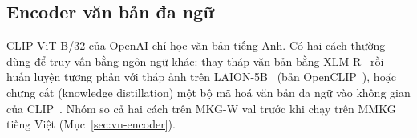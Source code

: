 \subsection{Encoder văn bản đa ngữ}

CLIP ViT-B/32 của OpenAI chỉ học văn bản tiếng Anh. Có hai cách thường dùng để truy vấn bằng ngôn ngữ khác: thay tháp văn
bản bằng XLM-R~\cite{vn-conneau2020xlmr} rồi huấn luyện tương phản với tháp ảnh trên LAION-5B~\cite{vn-schuhmann2022laion5b}
(bản OpenCLIP~\cite{vn-ilharco2021openclip}), hoặc chưng cất (knowledge distillation) một bộ mã hoá văn bản đa ngữ vào
không gian của CLIP~\cite{vn-reimers2020multilingual}. Nhóm so cả hai cách trên MKG-W val trước khi chạy trên MMKG tiếng
Việt (Mục~\ref{sec:vn-encoder}).
